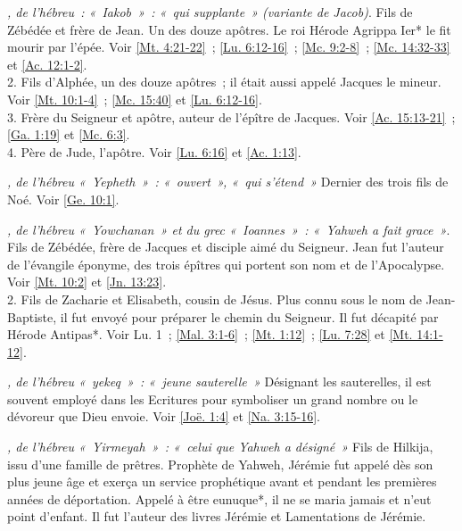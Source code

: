 \begin{multicols}{2}
\textit{, de l'hébreu~: «~Iakob~»~: «~qui supplante~» (variante de Jacob)}. Fils de Zébédée et frère de Jean. Un des douze apôtres. Le roi Hérode Agrippa Ier* le fit mourir par l'épée. Voir \vref{Mt. 4:21-22}~; \vref{Lu. 6:12-16}~; \vref{Mc. 9:2-8}~; \vref{Mc. 14:32-33} et \vref{Ac. 12:1-2}.
\\2. Fils d'Alphée, un des douze apôtres~; il était aussi appelé Jacques le mineur. Voir \vref{Mt. 10:1-4}~; \vref{Mc. 15:40} et \vref{Lu. 6:12-16}.
\\3. Frère du Seigneur et apôtre, auteur de l'épître de Jacques. Voir \vref{Ac. 15:13-21}~; \vref{Ga. 1:19} et \vref{Mc. 6:3}.
\\4. Père de Jude, l'apôtre. Voir \vref{Lu. 6:16} et \vref{Ac. 1:13}.

\textit{, de l'hébreu «~Yepheth~»~: «~ouvert~», «~qui s'étend~»}\newline
Dernier des trois fils de Noé. Voir \vref{Ge. 10:1}.

\textit{, de l'hébreu «~Yowchanan~» et du grec «~Ioannes~»~: «~Yahweh a fait grace~»}. Fils de Zébédée, frère de Jacques et disciple aimé du Seigneur. Jean fut l'auteur de l'évangile éponyme, des trois épîtres qui portent son nom et de l'Apocalypse. Voir \vref{Mt. 10:2} et \vref{Jn. 13:23}.
\\2. Fils de Zacharie et Elisabeth, cousin de Jésus. Plus connu sous le nom de Jean-Baptiste, il fut envoyé pour préparer le chemin du Seigneur. Il fut décapité par Hérode Antipas*.\newline
Voir Lu. 1~; \vref{Mal. 3:1-6}~; \vref{Mt. 1:12}~; \vref{Lu. 7:28} et \vref{Mt. 14:1-12}.

\textit{, de l'hébreu «~yekeq~»~: «~jeune sauterelle~»}\newline
Désignant les sauterelles, il est souvent employé dans les Ecritures pour symboliser un grand nombre ou le dévoreur que Dieu envoie.\newline
Voir \vref{Joë. 1:4} et \vref{Na. 3:15-16}.

\textit{, de l'hébreu «~Yirmeyah~»~: «~celui que Yahweh a désigné~»}\newline
Fils de Hilkija, issu d'une famille de prêtres. Prophète de Yahweh, Jérémie fut appelé dès son plus jeune âge et exerça un service prophétique avant et pendant les premières années de déportation. Appelé à être eunuque*, il ne se maria jamais et n'eut point d'enfant. Il fut l'auteur des livres Jérémie et Lamentations de Jérémie.


\end{multicols}
